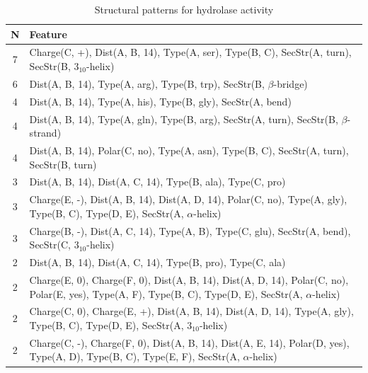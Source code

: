 \documentclass[11pt,twoside,a4paper]{book}
\begin{document}
\begin{table}\begin{tabularx}{\textwidth}{cX}\textbf{N} & \textbf{Feature} \\ \hline  
7 & Charge(C, +), Dist(A, B, 14),  Type(A, ser), Type(B, C), SecStr(A, turn), \newline SecStr(B, $3_{10}$-helix)\\ \hline 
6 & Dist(A, B, 14),  Type(A, arg), Type(B, trp), SecStr(B, $\beta$-bridge)\\ \hline 
4 & Dist(A, B, 14),  Type(A, his), Type(B, gly), SecStr(A, bend)\\ \hline 
4 & Dist(A, B, 14),  Type(A, gln), Type(B, arg), SecStr(A, turn), SecStr(B, $\beta$-strand)\\ \hline 
4 & Dist(A, B, 14), Polar(C, no),  Type(A, asn), Type(B, C), SecStr(A, turn), \newline SecStr(B, turn)\\ \hline 
3 & Dist(A, B, 14), Dist(A, C, 14),  Type(B, ala), Type(C, pro)\\ \hline 
3 & Charge(E, -), Dist(A, B, 14), Dist(A, D, 14), Polar(C, no),  Type(A, gly), \newline Type(B, C), Type(D, E), SecStr(A, $\alpha$-helix)\\ \hline 
3 & Charge(B, -), Dist(A, C, 14),  Type(A, B), Type(C, glu), SecStr(A, bend), \newline SecStr(C, $3_{10}$-helix)\\ \hline 
2 & Dist(A, B, 14), Dist(A, C, 14),  Type(B, pro), Type(C, ala)\\ \hline 
2 & Charge(E, 0), Charge(F, 0), Dist(A, B, 14), Dist(A, D, 14), Polar(C, no), \newline Polar(E, yes),  Type(A, F), Type(B, C), Type(D, E), SecStr(A, $\alpha$-helix)\\ \hline 
2 & Charge(C, 0), Charge(E, +), Dist(A, B, 14), Dist(A, D, 14),  Type(A, gly), \newline Type(B, C), Type(D, E), SecStr(A, $3_{10}$-helix)\\ \hline 
2 & Charge(C, -), Charge(F, 0), Dist(A, B, 14), Dist(A, E, 14), Polar(D, yes),  \newline Type(A, D), Type(B, C), Type(E, F), SecStr(A, $\alpha$-helix)\\ \hline 
 \end{tabularx}\caption{Structural patterns for hydrolase activity}\label{tab:hydrolase_activity}\end{table}
\end{document}
